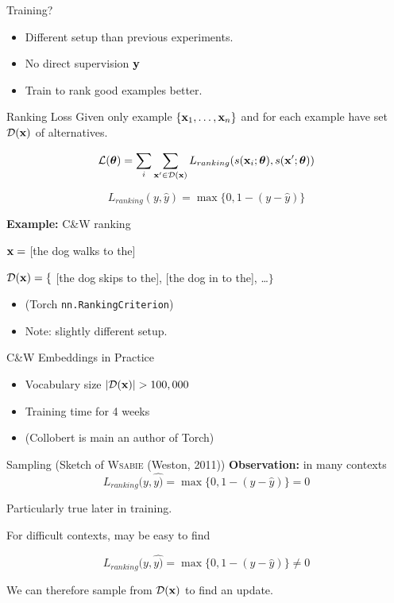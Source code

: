 \documentclass{beamer}
\begin{document}
\begin{frame}{Training?}
  \begin{itemize}
  \item Different setup than previous experiments.
    \air

  \item No direct supervision $\mathbf{y}$
    \air
  \item Train to rank good examples better.
  \end{itemize}
\end{frame}


\begin{frame}{Ranking Loss}
  Given only example $\{ \mathbf{x}_1, \ldots, \mathbf{x}_n \}$ and for
  each example have set $\mathcal{D}(\mathbf{x})$ of alternatives.

  \[ \mathcal{L}(\boldsymbol{\theta}) = \sum_i \sum_{\mathbf{x}' \in \mathcal{D}(\mathbf{x})} L_{ranking}(s(\mathbf{x}_i;\boldsymbol{\theta}), s(\mathbf{x}'; \boldsymbol{\theta}) ) \]

  \[ L_{ranking}(y, \hat{y}) = \max\{0, 1 - (y - \hat{y}) \}   \]

  \textbf{Example:} C\&W ranking

  \begin{center}
    $\mathbf{x} =$ [the dog walks to the]
    \air

    $\mathcal{D}(\mathbf{x}) = \{$ [the dog \alert{skips} to the], [the dog
    \alert{in} to the], \ldots $\}$

  \end{center}
  \begin{itemize}
  \item (Torch \texttt{nn.RankingCriterion})
    \air
  \item Note: slightly different setup.
  \end{itemize}
\end{frame}

\begin{frame}{C\&W Embeddings in Practice}
  \begin{itemize}
  \item Vocabulary size $|\mathcal{D}(\mathbf{x})| > 100,000$
    \air

  \item Training time for 4 weeks
    \air

  \item (Collobert is main an author of Torch)
  \end{itemize}
\end{frame}

\begin{frame}{Sampling (Sketch of \textsc{Wsabie} (Weston, 2011))}
  \textbf{Observation:} in many contexts
  \[ L_{ranking}(y, \hat{y)} = \max\{0, 1 - (y - \hat{y}) \} = 0 \]

  Particularly true later in training.

  \airj

  For difficult contexts, may be easy to find

  \[ L_{ranking}(y, \hat{y)} = \max\{0, 1 - (y - \hat{y}) \} \neq 0 \]

  We can therefore sample from $\mathcal{D}(\mathbf{x})$ to find an update.

\end{frame}
\end{document}
